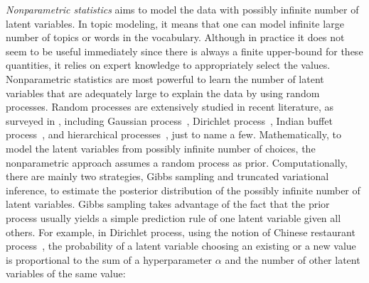 \emph{Nonparametric statistics} aims to model the data with possibly infinite
number of latent variables. In topic modeling, it means that one can model
infinite large number of topics or words in the vocabulary. Although in practice
it does not seem to be useful immediately since there is always a finite
upper-bound for these quantities, it relies on expert knowledge to appropriately
select the values. Nonparametric statistics are most powerful to learn the
number of latent variables that are adequately large to explain the data by
using random processes. Random processes are extensively studied in recent
literature, as surveyed in \cite{hajek2015random}, including Gaussian
process~\cite{rasmussen2006gaussian}, Dirichlet process~\cite{teh2011dirichlet},
Indian buffet process~\cite{ghahramani2005infinite}, and hierarchical
processes~\cite{teh2012hierarchical,griffiths2004hierarchical,blei2010nested},
just to name a few. Mathematically, to model the latent variables from possibly
infinite number of choices, the nonparametric approach assumes a random process
as prior. Computationally, there are mainly two strategies, Gibbs sampling and
truncated variational inference, to estimate the posterior distribution of the
possibly infinite number of latent variables. Gibbs sampling takes advantage of
the fact that the prior process usually yields a simple prediction rule of one
latent variable given all others. For example, in Dirichlet process, using the
notion of Chinese restaurant process~\cite{pitman2002combinatorial}, the
probability of a latent variable choosing an existing or a new value is
proportional to the sum of a hyperparameter $\alpha$ and the number of other
latent variables of the same value:

